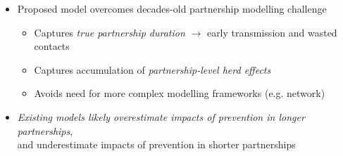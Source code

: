 \begin{itemize}
  \item Proposed model overcomes decades-old partnership modelling challenge\cite{2}
  \begin{itemize}[left=0pt]
    \item Captures \emph{true partnership duration} $\rightarrow$ early transmission and wasted contacts
    \item Captures accumulation of \emph{partnership-level herd effects}
    \item Avoids need for more complex modelling frameworks (e.g. network)
  \end{itemize}
  \item \emph{Existing models likely overestimate impacts of prevention in longer partnerships},\\
        and {underestimate impacts of prevention in shorter partnerships}
\end{itemize}